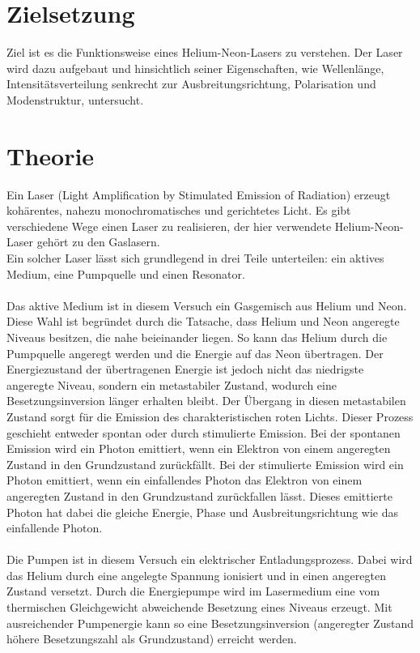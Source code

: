 \section{Zielsetzung}
\label{sec:Zielsetzung}
Ziel ist es die Funktionsweise eines Helium-Neon-Lasers zu verstehen. Der Laser wird dazu aufgebaut und hinsichtlich seiner Eigenschaften, wie Wellenlänge, Intensitätsverteilung
senkrecht zur Ausbreitungsrichtung, Polarisation und Modenstruktur, untersucht.

\section{Theorie}
\label{sec:Theorie}
Ein Laser (Light Amplification by Stimulated Emission of Radiation) erzeugt kohärentes, nahezu monochromatisches und gerichtetes Licht. Es gibt verschiedene Wege einen Laser
zu realisieren, der hier verwendete Helium-Neon-Laser gehört zu den Gaslasern.\\
Ein solcher Laser lässt sich grundlegend in drei Teile unterteilen: ein aktives Medium, eine Pumpquelle und einen Resonator.\\
\\
Das aktive Medium ist in diesem Versuch ein Gasgemisch aus Helium und Neon. Diese Wahl ist begründet durch die Tatsache, dass Helium und Neon angeregte Niveaus besitzen, die
nahe beieinander liegen. So kann das Helium durch die Pumpquelle angeregt werden und die Energie auf das Neon übertragen. Der Energiezustand der übertragenen Energie ist jedoch
nicht das niedrigste angeregte Niveau, sondern ein metastabiler Zustand, wodurch eine Besetzungsinversion länger erhalten bleibt. Der Übergang in diesen metastabilen Zustand
sorgt für die Emission des charakteristischen roten Lichts. Dieser Prozess geschieht entweder spontan oder durch stimulierte Emission. Bei der spontanen Emission wird ein Photon
emittiert, wenn ein Elektron von einem angeregten Zustand in den Grundzustand zurückfällt. Bei der stimulierte Emission wird ein Photon emittiert, wenn ein einfallendes Photon
das Elektron von einem angeregten Zustand in den Grundzustand zurückfallen lässt. Dieses emittierte Photon hat dabei die gleiche Energie, Phase und Ausbreitungsrichtung wie das
einfallende Photon.\\
\\
Die Pumpen ist in diesem Versuch ein elektrischer Entladungsprozess. Dabei wird das Helium durch eine angelegte Spannung ionisiert und in einen angeregten Zustand versetzt.
Durch die Energiepumpe wird im Lasermedium eine vom thermischen Gleichgewicht abweichende Besetzung eines Niveaus erzeugt. Mit ausreichender Pumpenergie kann so eine Besetzungsinversion (angeregter Zustand höhere Besetzungszahl als Grundzustand) erreicht werden.\\
